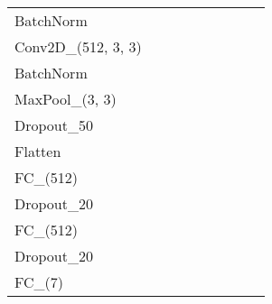 \begin{table}
{\begin{tabular}{@{}lllllllll@{}}
BatchNorm             &                       &                       &                       &                       &                       &                       &                       &                       \\
Conv2D\_(512, 3, 3)   &                       &                       &                       &                       &                       &                       &                       &                       \\
BatchNorm             &                       &                       &                       &                       &                       &                       &                       &                       \\
MaxPool\_(3, 3)       &                       &                       &                       &                       &                       &                       &                       &                       \\
Dropout\_50           &                       &                       &                       &                       &                       &                       &                       &                       \\
Flatten               &                       &                       &                       &                       &                       &                       &                       &                       \\
FC\_(512)             &                       &                       &                       &                       &                       &                       &                       &                       \\
Dropout\_20           &                       &                       &                       &                       &                       &                       &                       &                       \\
FC\_(512)             &                       &                       &                       &                       &                       &                       &                       &                       \\
Dropout\_20           &                       &                       &                       &                       &                       &                       &                       &                       \\
FC\_(7)               &                       &                       &                       &                       &                       &                       &                       &                       \\ \bottomrule
\end{tabular}%
}
\end{table}